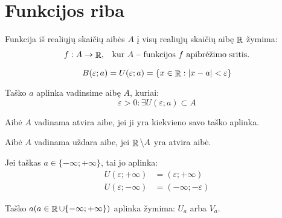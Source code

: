 \chapter{Funkcijos riba}

\begin{notation}
  Funkcija iš realiųjų skaičių aibės $A$ į visų realiųjų skaičių aibę 
  $\mathop{\mathbb{R}}$ žymima:
  \[
  \begin{array}[]{c l}
    f : A \to \RSET, & \text{kur $A$ – funkcijos $f$ apibrėžimo sritis.}
  \end{array}
  \]
\end{notation}

\begin{defn}
  \[
  B(\varepsilon; a) = U(\varepsilon; a) =%
  \{ x \in \RSET : |x - a| < \varepsilon \}
  \]
\end{defn}

\begin{defn}
  Taško $a$ aplinka vadinsime aibę $A$, kuriai:
  \[
  \varepsilon > 0 : \exists U(\varepsilon; a) \subset A
  \]
\end{defn}

\begin{defn}
  Aibė $A$ vadinama atvira aibe, jei ji yra kiekvieno savo taško aplinka.
\end{defn}

\begin{defn}
  Aibė $A$ vadinama uždara aibe, jei $\mathop{\mathbb{R}} \setminus A$ yra atvira aibė.
\end{defn}

\begin{note}
  Jei taškas $a \in \{-\infty; +\infty\}$, tai jo aplinka:
  \begin{align*}
    U(\varepsilon; +\infty) &= (\varepsilon; +\infty) \\
    U(\varepsilon; -\infty) &= (-\infty; -\varepsilon)
  \end{align*}
\end{note}

\begin{notation}
  Taško $a (a \in \mathop{\mathbb{R}} \cup \{-\infty;+\infty\})$ aplinka žymima:
  $U_{a}$ arba $V_{a}$.
\end{notation}

